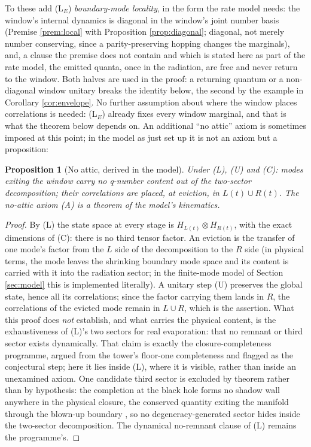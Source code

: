 \documentclass[11pt]{article}
\newtheorem{proposition}[theorem]{Proposition}
\theoremstyle{definition}
\begin{document}
To these add (L$_E$) \emph{boundary-mode locality}, in the form the rate model needs: the window's internal dynamics is diagonal in the window's joint number basis (Premise \ref{prem:local} with Proposition \ref{prop:diagonal}; diagonal, not merely number conserving, since a parity-preserving hopping changes the marginals), and, a clause the premise does not contain and which is stated here as part of the rate model, the emitted quanta, once in the radiation, are free and never return to the window. Both halves are used in the proof: a returning quantum or a non-diagonal window unitary breaks the identity below, the second by the example in Corollary \ref{cor:envelope}. No further assumption about where the window places correlations is needed: (L$_E$) already fixes every window marginal, and that is what the theorem below depends on. An additional ``no attic'' axiom is sometimes imposed at this point; in the model as just set up it is not an axiom but a proposition:

\begin{proposition}[No attic, derived in the model]\label{prop:noattic}
Under (L), (U) and (C): modes exiting the window carry no q-number content out of the two-sector decomposition; their correlations are placed, at eviction, in $L(t) \cup R(t)$. The no-attic axiom (A) is a theorem of the model's kinematics.
\end{proposition}

\begin{proof}
By (L) the state space at every stage is $H_{L(t)} \otimes H_{R(t)}$, with the exact dimensions of (C): there is no third tensor factor. An eviction is the transfer of one mode's factor from the $L$ side of the decomposition to the $R$ side (in physical terms, the mode leaves the shrinking boundary mode space and its content is carried with it into the radiation sector; in the finite-mode model of Section \ref{sec:model} this is implemented literally). A unitary step (U) preserves the global state, hence all its correlations; since the factor carrying them lands in $R$, the correlations of the evicted mode remain in $L \cup R$, which is the assertion. What this proof does \emph{not} establish, and what carries the physical content, is the exhaustiveness of (L)'s two sectors for real evaporation: that no remnant or third sector exists dynamically. That claim is exactly the closure-completeness programme, argued from the tower's floor-one completeness \cite[Cor.~6.2]{ButlerT3} and flagged as the conjectural step; here it lies inside (L), where it is visible, rather than inside an unexamined axiom. One candidate third sector is excluded by theorem rather than by hypothesis: the completion at the black hole forms no shadow wall anywhere in the physical closure, the conserved quantity exiting the manifold through the blown-up boundary \cite[Thm.~8.12, Rem.~8.13]{ButlerT4}, so no degeneracy-generated sector hides inside the two-sector decomposition. The dynamical no-remnant clause of (L) remains the programme's.
\end{proof}
\end{document}
